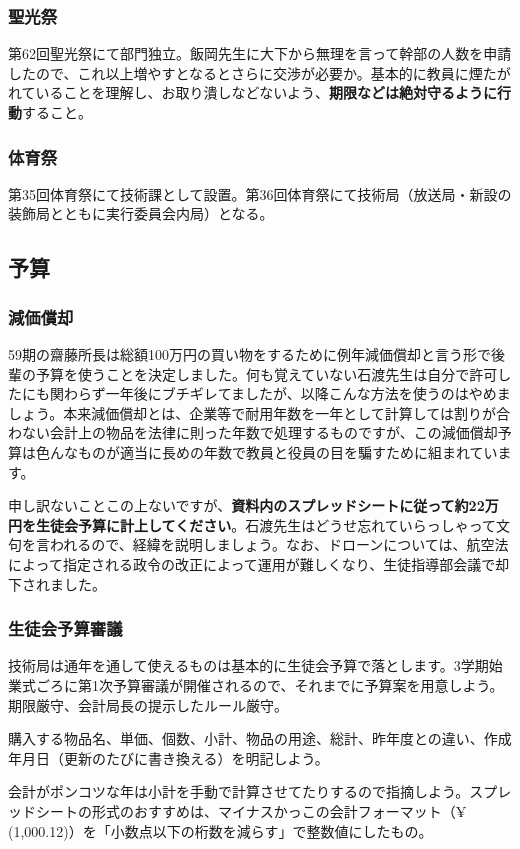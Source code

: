 \documentclass[dvipdfmx,jb5]{jarticle}
\begin{document}
\subsubsection{聖光祭}
第62回聖光祭にて部門独立。飯岡先生に大下から無理を言って幹部の人数を申請したので、これ以上増やすとなるとさらに交渉が必要か。基本的に教員に煙たがれていることを理解し、お取り潰しなどないよう、{\bf 期限などは絶対守るように行動}すること。
\subsubsection{体育祭}
第35回体育祭にて技術課として設置。第36回体育祭にて技術局（放送局・新設の装飾局とともに実行委員会内局）となる。

\subsection{予算}\label{sec:予算}
\subsubsection{減価償却}
59期の齋藤所長は総額100万円の買い物をするために例年減価償却と言う形で後輩の予算を使うことを決定しました。何も覚えていない石渡先生は自分で許可したにも関わらず一年後にブチギレてましたが、以降こんな方法を使うのはやめましょう。本来減価償却とは、企業等で耐用年数を一年として計算しては割りが合わない会計上の物品を法律に則った年数で処理するものですが、この減価償却予算は色んなものが適当に長めの年数で教員と役員の目を騙すために組まれています。

申し訳ないことこの上ないですが、{\bf 資料内のスプレッドシートに従って約22万円を生徒会予算に計上してください}。石渡先生はどうせ忘れていらっしゃって文句を言われるので、経緯を説明しましょう。なお、ドローンについては、航空法によって指定される政令の改正によって運用が難しくなり、生徒指導部会議で却下されました。

\subsubsection{生徒会予算審議}
技術局は通年を通して使えるものは基本的に生徒会予算で落とします。3学期始業式ごろに第1次予算審議が開催されるので、それまでに予算案を用意しよう。期限厳守、会計局長の提示したルール厳守。

購入する物品名、単価、個数、小計、物品の用途、総計、昨年度との違い、作成年月日（更新のたびに書き換える）を明記しよう。

会計がポンコツな年は小計を手動で計算させてたりするので指摘しよう。スプレッドシートの形式のおすすめは、マイナスかっこの会計フォーマット（¥ (1,000.12)）を「小数点以下の桁数を減らす」で整数値にしたもの。
\end{document}
